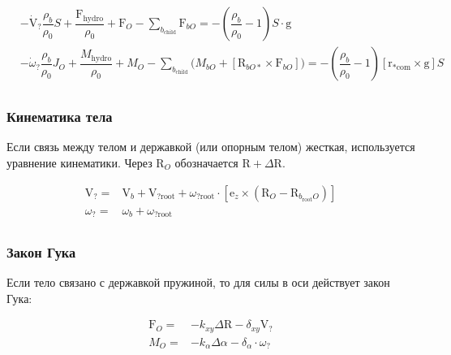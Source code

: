 \documentclass[14pt]{extreport}
\newcommand{\br}[1]{\boldsymbol{\mathrm{#1}}}
\renewcommand{\vec}[1]{\br{#1}}
\begin{document}
\begin{equation}
\label{eq_newton}
\begin{split}
&- \vec{\dot V}_? \dfrac{\rho_b}{\rho_0}S
+ \dfrac{\vec F_\text{hydro}}{\rho_0}
+ \vec F_O - \sum_{b_\text{child}} \vec F_{bO}
=
- \left( \dfrac{\rho_b}{\rho_0} - 1 \right)S \cdot \vec g\\
&- \dot \omega_? \dfrac{\rho_b}{\rho_0}J_O
+ \dfrac{M_\text{hydro}}{\rho_0}
+ M_O - \sum_{b_\text{child}} \bigl( M_{bO} + [\vec R_{bO*} \times \vec F_{bO}] \bigr)
=
- \left( \dfrac{\rho_b}{\rho_0} - 1 \right) [\vec r_{*\text{com}} \times \vec g] S \\
\end{split}
\end{equation}

\subsubsection{Кинематика тела}
\label{slau_kinematics}

Если связь между телом и державкой (или опорным телом) жесткая, используется уравнение кинематики. Через $\vec R_O$ обозначается $\vec R+\Delta \vec R$.

\begin{equation}
\begin{split}
\vec V_? =& \vec V_b + \vec V_{?\text{root}} +\omega_{?\text{root}} \cdot
[\vec e_z \times \left( \vec R_O - \vec R_{b_\text{root}O} \right)] \\
\omega_? =& \omega_b + \omega_{?\text{root}} \\
\end{split}
\end{equation}

\subsubsection{Закон Гука}
\label{slau_hooke}

Если тело связано с державкой пружиной, то для силы в оси действует закон Гука:

\begin{equation}
\begin{split}
\vec F_O =& - k_{xy} \Delta \vec R - \delta_{xy} \vec V_?\\
M_O =& -k_\alpha \Delta \alpha - \delta_\alpha \cdot \omega_? \\
\end{split}
\end{equation}
\end{document}
